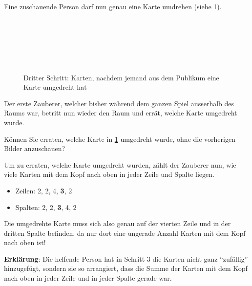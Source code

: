 Eine zuschauende Person darf nun genau eine Karte umdrehen (siehe \cref{fig:zauberer-3}).
\begin{figure}[H]
    \centering
    \\
    \\
    \\
    \\
    \\
    \caption{Dritter Schritt: Karten, nachdem jemand aus dem Publikum eine Karte umgedreht hat}
    \label{fig:zauberer-3}
\end{figure}
Der erste Zauberer, welcher bisher während dem ganzen Spiel ausserhalb des Raums war, betritt nun wieder den Raum und errät, welche Karte umgedreht wurde.

\begin{mychallenge}
    Können Sie erraten, welche Karte in \cref{fig:zauberer-3} umgedreht wurde, ohne die vorherigen Bilder anzuschauen?
\end{mychallenge}

Um zu erraten, welche Karte umgedreht wurden, zählt der Zauberer nun, wie viele Karten mit dem Kopf nach oben in jeder Zeile und Spalte liegen.
\begin{itemize}
    \item Zeilen: 2, 2, 4, \textbf{3}, 2
    \item Spalten: 2, 2, \textbf{3}, 4, 2
\end{itemize}

Die umgedrehte Karte muss sich also genau auf der vierten Zeile und in der dritten Spalte befinden, da nur dort eine ungerade Anzahl Karten mit dem Kopf nach oben ist!

\textbf{Erklärung}: Die helfende Person hat in Schritt 3 die Karten nicht ganz \enquote{zufällig} hinzugefügt, sondern sie so arrangiert, dass die Summe der Karten mit dem Kopf nach oben in jeder Zeile und in jeder Spalte gerade war.

